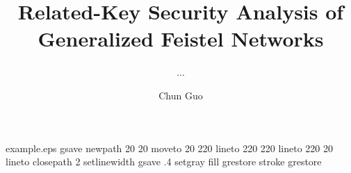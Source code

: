 \begin{filecontents*}{example.eps}
gsave
newpath
  20 20 moveto
  20 220 lineto
  220 220 lineto
  220 20 lineto
closepath
2 setlinewidth
gsave
  .4 setgray fill
grestore
stroke
grestore
\end{filecontents*}
%
\RequirePackage{fix-cm}
%
\documentclass[smallextended]{svjour3}       %
%
\smartqed  %
%


%
%

\usepackage{graphicx}
\usepackage[english]{babel}
\usepackage{blindtext}
\usepackage{algorithm}
\usepackage{algpseudocode}
\usepackage{bm}
\usepackage{multirow}
\usepackage{amsmath}
\usepackage{mathtools}
\usepackage{mathrsfs}
\usepackage{theorem}
\usepackage{amsfonts,amssymb}
\usepackage{multicol}


\usepackage{extarrows}

\usepackage[inline]{enumitem}




%




\renewcommand\theenumi{\roman{enumi}}
\renewcommand\labelenumi{(\theenumi)}


%
%



\title{Related-Key Security Analysis of Generalized Feistel Networks%
}





\author{... \and Chun Guo}





